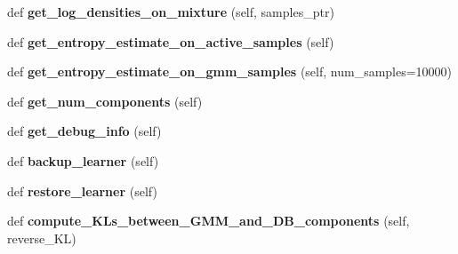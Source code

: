 \begin{DoxyCompactItemize}
\item 
def {\bfseries get\+\_\+log\+\_\+densities\+\_\+on\+\_\+mixture} (self, samples\+\_\+ptr)\hypertarget{classVIPS__PythonWrapper_1_1VIPS__PythonWrapper_a6ccb306fac4c0dcaf679c53528607eb4}{}\label{classVIPS__PythonWrapper_1_1VIPS__PythonWrapper_a6ccb306fac4c0dcaf679c53528607eb4}

\item 
def {\bfseries get\+\_\+entropy\+\_\+estimate\+\_\+on\+\_\+active\+\_\+samples} (self)\hypertarget{classVIPS__PythonWrapper_1_1VIPS__PythonWrapper_aeccd2f1e30b31c42b9105ce36433a2bb}{}\label{classVIPS__PythonWrapper_1_1VIPS__PythonWrapper_aeccd2f1e30b31c42b9105ce36433a2bb}

\item 
def {\bfseries get\+\_\+entropy\+\_\+estimate\+\_\+on\+\_\+gmm\+\_\+samples} (self, num\+\_\+samples=10000)\hypertarget{classVIPS__PythonWrapper_1_1VIPS__PythonWrapper_ad7d1978419a0e99bf79a051dc174e968}{}\label{classVIPS__PythonWrapper_1_1VIPS__PythonWrapper_ad7d1978419a0e99bf79a051dc174e968}

\item 
def {\bfseries get\+\_\+num\+\_\+components} (self)\hypertarget{classVIPS__PythonWrapper_1_1VIPS__PythonWrapper_af7d7d4b29e32db8750097d7c7d70ae3a}{}\label{classVIPS__PythonWrapper_1_1VIPS__PythonWrapper_af7d7d4b29e32db8750097d7c7d70ae3a}

\item 
def {\bfseries get\+\_\+debug\+\_\+info} (self)\hypertarget{classVIPS__PythonWrapper_1_1VIPS__PythonWrapper_ae8b85814af86a48fc056835adcf7e1b7}{}\label{classVIPS__PythonWrapper_1_1VIPS__PythonWrapper_ae8b85814af86a48fc056835adcf7e1b7}

\item 
def {\bfseries backup\+\_\+learner} (self)\hypertarget{classVIPS__PythonWrapper_1_1VIPS__PythonWrapper_a91d685f7c3643b33d570e2e10e1df8cc}{}\label{classVIPS__PythonWrapper_1_1VIPS__PythonWrapper_a91d685f7c3643b33d570e2e10e1df8cc}

\item 
def {\bfseries restore\+\_\+learner} (self)\hypertarget{classVIPS__PythonWrapper_1_1VIPS__PythonWrapper_ab443f0f71c3cda42e5fd2c35b618b47a}{}\label{classVIPS__PythonWrapper_1_1VIPS__PythonWrapper_ab443f0f71c3cda42e5fd2c35b618b47a}

\item 
def {\bfseries compute\+\_\+\+K\+Ls\+\_\+between\+\_\+\+G\+M\+M\+\_\+and\+\_\+\+D\+B\+\_\+components} (self, reverse\+\_\+\+KL)\hypertarget{classVIPS__PythonWrapper_1_1VIPS__PythonWrapper_acff8ed89b9041378a5082beb2bfd846b}{}\label{classVIPS__PythonWrapper_1_1VIPS__PythonWrapper_acff8ed89b9041378a5082beb2bfd846b}

\end{DoxyCompactItemize}
